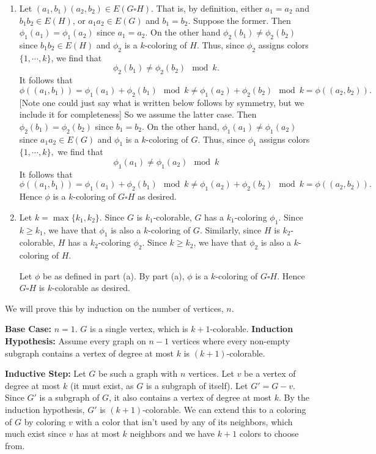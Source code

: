 \begin{enumerate}
   
    \begin{enumerate}
    \item Let $(a_1, b_1)(a_2, b_2) \in E(G \square H).$ That is, by definition, either $a_1 = a_2$ and $b_1b_2 \in E(H)$, or $a_1a_2\in E(G)$ and $b_1 = b_2$. Suppose the former. Then $\phi_1(a_1) = \phi_1(a_2)$ since $a_1 = a_2$. On the other hand $\phi_2(b_1) \neq \phi_2(b_2)$ since $b_1b_2 \in E(H)$ and $\phi_2$ is a $k$-coloring of $H$. Thus, since $\phi_2$ assigns colors $\{1,\cdots,k\}$, we find that 
    \[\phi_2(b_1) \neq \phi_2(b_2) \mod{k}.\]
It follows that 
\[\phi((a_1, b_1)) = \phi_1(a_1) + \phi_2(b_1) \mod{k} \neq \phi_1(a_2) + \phi_2(b_2) \mod{k} = \phi((a_2, b_2)).\]
    [Note one could just say what is written below follows by symmetry, but we include it
for completeness]
So we assume the latter case. Then $\phi_2(b_1) = \phi_2(b_2)$ since $b_1 = b_2$. On the other hand, $\phi_1(a_1) \neq \phi_1(a_2)$ since $a_1a_2 \in E(G)$ and $\phi_1$ is a $k$-coloring of $G$. Thus, since $\phi_1$ assigns colors $\{1,\cdots,k\},$ we find that 
\[\phi_1(a_1) \neq \phi_1(a_2) \mod{k}\]
It follows that
\[\phi((a_1,b_1)) = \phi_1(a_1) + \phi_2(b_1) \mod{k} \neq \phi_1(a_2) + \phi_2(b_2) \mod{k} = \phi((a_2, b_2)).\]
Hence $\phi$ is a $k$-coloring of $G\square H$ as desired.
\item Let $k=\max\{k_1,k_2\}.$ Since $G$ is $k_1$-colorable, $G$ has a $k_1$-coloring $\phi_1$. Since $k \geq k_1$, we have that $\phi_1$ is also a $k$-coloring of $G$. Similarly, since $H$ is $k_2$-colorable, $H$ has a $k_2$-coloring $\phi_2$. Since $k \geq k_2$, we have that $\phi_2$ is also a $k$-coloring of $H$.

Let $\phi$ be as defined in part (a). By part (a), $\phi$ is a $k$-coloring of $G\square H$. Hence $G\square H$ is $k$-colorable as desired.
\end{enumerate}
     We will prove this by induction on the number of vertices, $n$.

    \textbf{Base Case:} $n = 1$. $G$ is a single vertex, which is $k+1$-colorable. 
    \textbf{Induction Hypothesis:} Assume every graph on $n-1$ vertices where every non-empty subgraph contains a vertex of degree at most $k$ is $(k+1)$-colorable.

    \textbf{Inductive Step:} Let $G$ be such a graph with $n$ vertices. Let $v$ be a vertex of degree at most $k$ (it must exist, as $G$ is a subgraph of itself). Let $G' = G - v$. Since $G'$ is a subgraph of $G$, it also contains a vertex of degree at most $k$. By the induction hypothesis, $G'$ is $(k+1)$-colorable. We can extend this to a coloring of $G$ by coloring $v$ with a color that isn't used by any of its neighbors, which much exist since $v$ has at most $k$ neighbors and we have $k +1$ colors to choose from. 


\end{enumerate}
